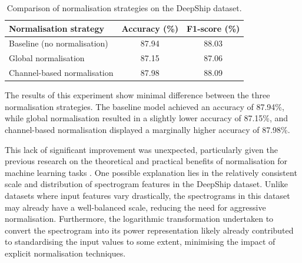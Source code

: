 \begin{table}[htbp]
    \centering
    \begin{tabular}{lcc}
        \toprule
        \textbf{Normalisation strategy} & \textbf{Accuracy (\%)} & \textbf{F1-score (\%)} \\
        \midrule
        Baseline (no normalisation)     & 87.94                     & 88.03 \\
        Global normalisation            & 87.15                     & 87.06 \\
        Channel-based normalisation     & 87.98                     & 88.09 \\
        \bottomrule
    \end{tabular}
    \caption{Comparison of normalisation strategies on the DeepShip dataset.}
    \label{tab:normalisation-results}
\end{table}

    
    

The results of this experiment show minimal difference between the three normalisation strategies. The baseline model achieved an accuracy of 87.94\%, while global normalisation resulted in a slightly lower accuracy of 87.15\%, and channel-based normalisation displayed a marginally higher accuracy of 87.98\%.

This lack of significant improvement was unexpected, particularly given the previous research on the theoretical and practical benefits of normalisation for machine learning tasks \cite{chris_kroenke_normalizing_2022, gunes_answer_2020, wu_group_2018, primus_frequency-wise_2023, simic_normalization_2023}. One possible explanation lies in the relatively consistent scale and distribution of spectrogram features in the DeepShip dataset. Unlike datasets where input features vary drastically, the spectrograms in this dataset may already have a well-balanced scale, reducing the need for aggressive normalisation. Furthermore, the logarithmic transformation undertaken to convert the spectrogram into its power representation likely already contributed to standardising the input values to some extent, minimising the impact of explicit normalisation techniques.

